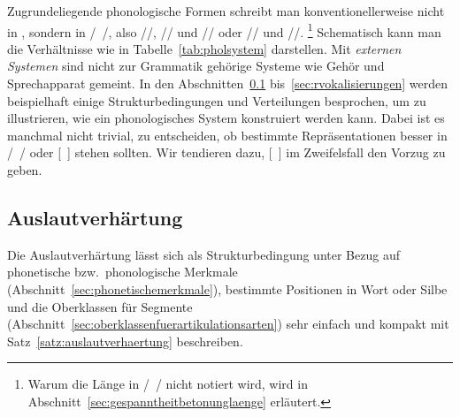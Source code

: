 \begin{table}[!htbp]
  \caption{Lexikon, Phonologie und Phonetik}
  \label{tab:pholsystem}
\end{table}

Zugrundeliegende phonologische Formen schreibt man konventionellerweise nicht in \textipa{[~]}, sondern in /~/, also \zB //, // und // oder // und \mbox{//}.%
\footnote{Warum die Länge in /~/ nicht notiert wird, wird in Abschnitt~\ref{sec:gespanntheitbetonunglaenge} erläutert.}
Schematisch kann man die Verhältnisse wie in Tabelle~\ref{tab:pholsystem} darstellen.
Mit \textit{externen Systemen} sind nicht zur Grammatik gehörige Systeme wie Gehör und Sprechapparat gemeint.
In den Abschnitten~\ref{sec:auslautverhaertungphonologie} bis~\ref{sec:rvokalisierungen} werden beispielhaft einige Strukturbedingungen und Verteilungen besprochen, um zu illustrieren, wie ein phonologisches System konstruiert werden kann.
Dabei ist es manchmal nicht trivial, zu entscheiden, ob bestimmte Repräsentationen besser in /~/ oder [~] stehen sollten.
Wir tendieren dazu, [~] im Zweifelsfall den Vorzug zu geben.

\subsection{Auslautverhärtung}

\label{sec:auslautverhaertungphonologie}

Die Auslautverhärtung lässt sich als Strukturbedingung unter Bezug auf phonetische bzw.\ phonologische Merkmale (Abschnitt~\ref{sec:phonetischemerkmale}), bestimmte Positionen in Wort oder Silbe und die Oberklassen für Segmente (Abschnitt~\ref{sec:oberklassenfuerartikulationsarten}) sehr einfach und kompakt mit Satz~\ref{satz:auslautverhaertung} beschreiben.

